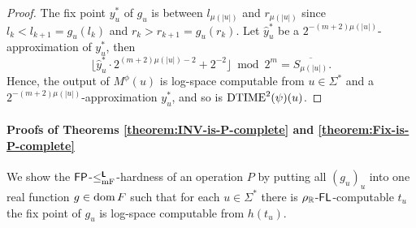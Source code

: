 \documentclass[envcountsame,orivec,oribibl]{llncs}
\begin{document}
\begin{proof}
 The fix point $y^*_u$ of $g_u$ is between $l_{\mu(|u|)}$ and $r_{\mu(|u|)}$ 
 since $l_k < l_{k+1} = g_u(l_k)$ and $r_k > r_{k+1} = g_u(r_k)$.
 Let $\hat y^*_u$ be a $2^{-(m+2)\mu(|u|)}$-approximation of $y^*_u$, then
\begin{equation}
 \lfloor \hat y^*_u \cdot 2^{(m+2)\mu(|u|)-2} + 2^{-2}\rfloor  \bmod 2^m
  =
  \overline{S_{\mu(|u|)}}.
\end{equation}
 Hence, the output of $M^\phi(u)$ is log-space computable from 
 $u \in \Sigma^*$ and a $2^{-(m+2)\mu(|u|)}$-approximation $y^*_u$, and so is
 $\mathrm{DTIME}^2(\psi)(u)$.
\end{proof}


\paragraph{Proofs of Theorems \ref{theorem:INV-is-P-complete} and \ref{theorem:Fix-is-P-complete}}
\label{section:proofs-of-theorems}

We show the $\mathsf{FP}$-$\leq _{\mathrm{mF}} ^{\text{\bfseries \sffamily \upshape L}}$-hardness of an operation $P$
by putting all $(g_u)_u$ into one real function $g \in \mathop{\rm dom} F$
such that for each $u \in \Sigma^*$ there is $\rho _\mathbb R$-$\mathsf{FL}$-computable
$t_u$ the fix point of $g_u$ is log-space computable from $h(t_u)$.
\end{document}
